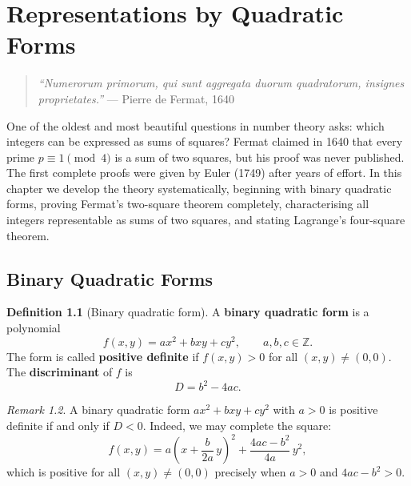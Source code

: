\documentclass[12pt,a4paper,openany]{book}
\theoremstyle{definition}
\newtheorem{definition}{Definition}[chapter]
\theoremstyle{plain}
\theoremstyle{remark}
\newtheorem{remark}[definition]{Remark}
\newcommand{\Z}{\mathbb{Z}}
\begin{document}

\chapter{Representations by Quadratic Forms}\label{ch:quadratic-forms}

\begin{quote}
\textit{``Numerorum primorum, qui sunt aggregata duorum quadratorum, insignes
proprietates.''} --- Pierre de Fermat, 1640
\end{quote}

\noindent
One of the oldest and most beautiful questions in number theory asks:
which integers can be expressed as sums of squares?  Fermat claimed in 1640
that every prime $p \equiv 1 \pmod{4}$ is a sum of two squares, but his proof
was never published.  The first complete proofs were given by Euler (1749) after
years of effort.  In this chapter we develop the theory systematically, beginning
with binary quadratic forms, proving Fermat's two-square theorem completely,
characterising all integers representable as sums of two squares, and stating
Lagrange's four-square theorem.

\section{Binary Quadratic Forms}\label{sec:binary-quad-forms}

\begin{definition}[Binary quadratic form]\label{def:binary-quad-form}
A \textbf{binary quadratic form} is a polynomial
\[
  f(x,y) = ax^2 + bxy + cy^2, \qquad a,b,c \in \Z.
\]
The form is called \textbf{positive definite}
if $f(x,y) > 0$ for all $(x,y) \neq (0,0)$.
The \textbf{discriminant} of $f$ is
\[
  D = b^2 - 4ac.
\]
\end{definition}

\begin{remark}\label{rem:disc-sign}
A binary quadratic form $ax^2 + bxy + cy^2$ with $a > 0$ is positive definite
if and only if $D < 0$.  Indeed, we may complete the square:
\[
  f(x,y) = a\!\left(x + \frac{b}{2a}\,y\right)^{\!2}
          + \frac{4ac - b^2}{4a}\,y^2,
\]
which is positive for all $(x,y)\neq(0,0)$ precisely when $a>0$ and $4ac - b^2 > 0$.
\end{remark}
\end{document}
